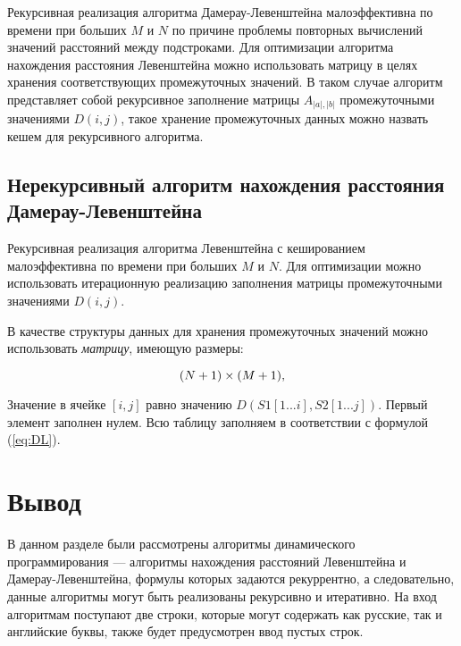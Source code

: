 Рекурсивная реализация алгоритма Дамерау-Левенштейна малоэффективна по времени при больших $M$ и $N$ по причине проблемы повторных вычислений значений расстояний между подстроками. Для оптимизации алгоритма нахождения расстояния Левенштейна можно использовать матрицу в целях хранения соответствующих промежуточных значений. В таком случае алгоритм представляет собой рекурсивное заполнение матрицы $A_{|a|,|b|}$ промежуточными значениями $D(i,j)$, такое хранение промежуточных данных можно назвать кешем для рекурсивного алгоритма.

\subsection{Нерекурсивный алгоритм нахождения расстояния Дамерау-Левенштейна}

Рекурсивная реализация алгоритма Левенштейна с кешированием малоэффективна по времени при больших $M$ и $N$. Для оптимизации можно использовать итерационную реализацию заполнения матрицы промежуточными значениями $D(i,j)$.

В качестве структуры данных для хранения промежуточных значений можно использовать \textit{матрицу}, имеющую  размеры:

\begin{equation}
	(N + 1)\\\times(M + 1),
\end{equation}

Значение в ячейке $[i, j]$ равно значению $D(S1[1...i], S2[1...j])$. Первый элемент заполнен нулем. Всю таблицу заполняем в соответствии с формулой (\ref{eq:DL}).

\section*{Вывод}

В данном разделе были рассмотрены алгоритмы динамического программирования --- алгоритмы нахождения расстояний Левенштейна и Дамерау-Левенштейна, формулы которых задаются рекуррентно, а следовательно, данные алгоритмы могут быть реализованы рекурсивно и итеративно. На вход алгоритмам поступают две строки, которые могут содержать как русские, так и английские буквы, также будет предусмотрен ввод пустых строк.

